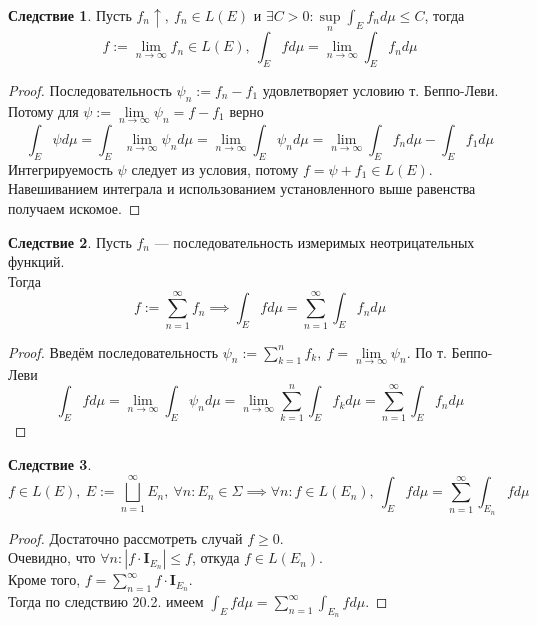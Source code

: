 \documentclass[11pt,a4paper]{report}
\theoremstyle{definition}
\theoremstyle{definition}
\newtheorem{corollary}{Следствие}[section]
\theoremstyle{definition}
\begin{document}
	\begin{corollary}
		Пусть $ f_{n} \uparrow,\ f_{n} \in L(E) $ и  $ \exists C > 0: \sup\limits_{n} \int_{E} f_{n} d\mu \le C $, тогда
		\[ f := \lim\limits_{n\to\infty} f_{n} \in L(E),\ \int_{E} f d\mu = \lim\limits_{n\to\infty} \int_{E} f_{n} d\mu \]
	\end{corollary}
	\begin{proof}
		Последовательность $ \psi_{n} := f_{n} - f_{1} $ удовлетворяет условию т. Беппо-Леви.\\
		Потому для $ \psi := \lim\limits_{n\to\infty} \psi_{n} = f - f_{1} $ верно
		\[  
			\int_{E} \psi d\mu = \int_{E} \lim\limits_{n\to\infty} \psi_{n} d\mu = \lim\limits_{n\to\infty} \int_{E} \psi_{n} d\mu = \lim\limits_{n\to\infty} \int_{E} f_{n} d\mu - \int_{E} f_{1} d\mu
		\]
		Интегрируемость $ \psi $ следует из условия, потому $ f = \psi + f_{1} \in L(E) $. Навешиванием интеграла и использованием установленного выше равенства получаем искомое.
	\end{proof}
	\begin{corollary}
		Пусть $ f_{n} $ — последовательность измеримых неотрицательных функций.\\
		Тогда 
		\[
			f := \sum\limits_{n=1}^{\infty} f_{n} \implies \int_{E} f d\mu = \sum\limits_{n=1}^{\infty} \int_{E} f_{n} d\mu
		\]
	\end{corollary}
	\begin{proof}
		Введём последовательность $ \psi_{n} := \sum_{k=1}^{n} f_{k},\ f = \lim\limits_{n\to\infty}\psi_{n} $. По т. Беппо-Леви
		\[
			\int_{E} f d\mu = \lim\limits_{n\to\infty} \int_{E} \psi_{n} d\mu = \lim\limits_{n\to\infty} \sum\limits_{k=1}^{n} \int_{E} f_{k} d\mu = \sum\limits_{n=1}^{\infty} \int_{E} f_{n} d\mu
		\]
	\end{proof}
	\begin{corollary}
		\[ f \in L(E),\ E := \bigsqcup\limits_{n=1}^{\infty} E_{n},\ \forall n: E_{n} \in \Sigma \implies \forall n: f \in L(E_{n}),\ \int_{E} f d\mu = \sum\limits_{n=1}^{\infty} \int_{E_{n}} f d\mu \]
	\end{corollary}
	\begin{proof}
		Достаточно рассмотреть случай $ f \ge 0 $.\\
		Очевидно, что $ \forall n: |f \cdot \mathbf{I}_{E_{n}}| \le f $, откуда $ f \in L(E_{n}) $.\\
		Кроме того, $ f = \sum\limits_{n=1}^{\infty} f \cdot \mathbf{I}_{E_{n}} $.\\
		Тогда по следствию 20.2. имеем $ \int_{E} f d\mu = \sum\limits_{n=1}^{\infty} \int_{E_{n}} f d\mu $.
	\end{proof}
\end{document}
